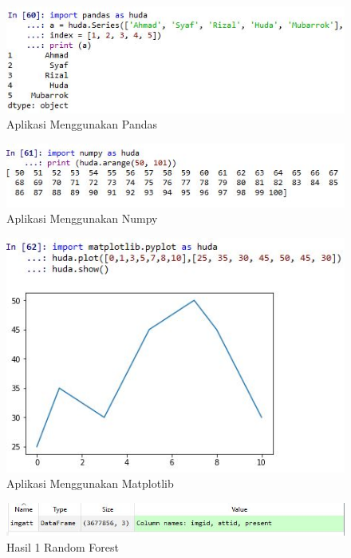 \begin{figure}
	\centerline{\includegraphics[width=1\textwidth]{figures/huda/chapter3_praktek/1.JPG}}
	\caption{Aplikasi Menggunakan Pandas}
	\label{h5}
\end{figure}

\begin{figure}[ht]
	\centerline{\includegraphics[width=1\textwidth]{figures/huda/chapter3_praktek/2.JPG}}
	\caption{Aplikasi Menggunakan Numpy}
	\label{h6}
\end{figure}

\begin{figure}[ht]
	\centerline{\includegraphics[width=1\textwidth]{figures/huda/chapter3_praktek/3.JPG}}
	\caption{Aplikasi Menggunakan Matplotlib}
	\label{h7}
\end{figure}

\begin{figure}[ht]
	\centerline{\includegraphics[width=1\textwidth]{figures/huda/chapter3_praktek/4.JPG}}
	\caption{Hasil 1 Random Forest}
	\label{h8}
\end{figure}

